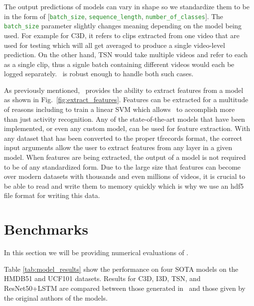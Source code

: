 \documentclass{llncs}
\begin{document}
The output predictions of models can vary in shape so we standardize them to be in the form of [\texttt{\textcolor{ForestGreen}{batch\_size}}, \texttt{\textcolor{ForestGreen}{sequence\_length}}, \texttt{\textcolor{ForestGreen}{number\_of\_classes}}].
The \texttt{\textcolor{ForestGreen}{batch\_size}} parameter slightly changes meaning depending on the model being used.
For example for C3D, it refers to clips extracted from one video that are used for testing which will all get averaged to produce a single video-level prediction.
On the other hand, TSN would take multiple videos and refer to each as a single clip, thus a signle batch containing different videos would each be logged separately.
\acro~is robust enough to handle both such cases.

As previously mentioned, \acro~provides the ability to extract features from a model as shown in Fig.~\ref{fig:extract_features}.
Features can be extracted for a multitude of reasons including to train a linear SVM which allows \acro~to accomplish more than just activity recognition.
Any of the state-of-the-art models that have been implemented, or even any custom model, can be used for feature extraction.
With any dataset that has been converted to the proper tfrecords format, the correct input arguments allow the user to extract features from any layer in a given model.
When features are being extracted, the output of a model is not required to be of any standardized form.
Due to the large size that features can become over modern datasets with thousands and even millions of videos, it is crucial to be able to read and write them to memory quickly which is why we use an hdf5 file format for writing this data.




\section{Benchmarks}
\label{sec:benchmarks}
In this section we will be providing numerical evaluations of \acro.

Table \ref{tab:model_results} show the performance on four SOTA models on the HMDB51 and UCF101 datasets.
Results for C3D, I3D, TSN, and ResNet50+LSTM are compared between those generated in \acro~and those given by the original authors of the models.
\end{document}
